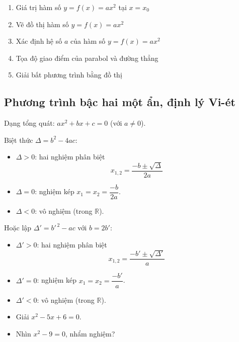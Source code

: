 \documentclass[12pt,a4paper]{article}
\begin{document}
\begin{enumerate}[label=\textbf{Dạng \arabic*:}, leftmargin=*, align=left]
  \item Giá trị hàm số $y = f(x) = ax^2$ tại $x = x_0$
  \item Vẽ đồ thị hàm số $y = f(x) = ax^2$
  \item Xác định hệ số $a$ của hàm số $y = f(x) = ax^2$
  \item Tọa độ giao điểm của parabol và đường thẳng
  \item Giải bất phương trình bằng đồ thị
\end{enumerate}

\subsection{Phương trình bậc hai một ẩn, định lý Vi-ét}

\begin{dinhnghia}
  Dạng tổng quát: $ax^2 + bx + c = 0$ \quad (với $a \neq 0$).
\end{dinhnghia}

\begin{congthuc}[title={Công thức nghiệm}]
  Biệt thức $\Delta = b^2 - 4ac$:
  \begin{itemize}
    \item $\Delta > 0$: hai nghiệm phân biệt
    \[x_{1,2} = \frac{-b \pm \sqrt{\Delta}}{2a}\]
    \item $\Delta = 0$: nghiệm kép $x_1 = x_2 = \dfrac{-b}{2a}$.
    \item $\Delta < 0$: vô nghiệm (trong $\mathbb{R}$).
  \end{itemize}

  \vspace{6pt}
  Hoặc lập $\Delta' = b'^{\,2} - ac$ với $b = 2b'$:
  \begin{itemize}
    \item $\Delta' > 0$: hai nghiệm phân biệt
    \[x_{1,2} = \frac{-b' \pm \sqrt{\Delta'}}{a}\]
    \item $\Delta' = 0$: nghiệm kép $x_1 = x_2 = \dfrac{-b'}{a}$.
    \item $\Delta' < 0$: vô nghiệm (trong $\mathbb{R}$).
  \end{itemize}
\end{congthuc}

\begin{vidu}
  \begin{itemize}
    \item Giải $x^2 - 5x + 6 = 0$.
    \item Nhìn $x^2 - 9 = 0$, nhẩm nghiệm?
  \end{itemize}
\end{vidu}
\end{document}
